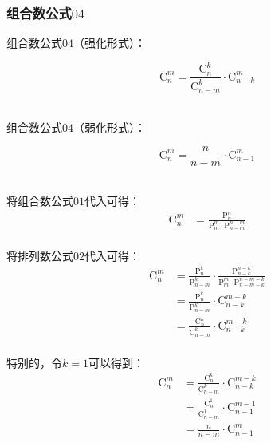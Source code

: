 \documentclass[UTF8]{ctexart}
\begin{document}
\subsubsection{组合数公式$04$}
    组合数公式$04$（强化形式）：
    \begin{large}
        \begin{equation*}
            \mathrm{C}_n^m=\frac{\mathrm{C}_n^k}{\mathrm{C}_{n-m}^k}\cdot\mathrm{C}_{n-k}^m
        \end{equation*}
    \end{large}\\
    组合数公式$04$（弱化形式）：
    \begin{large}
        \begin{equation*}
            \mathrm{C}_n^m=\frac{n}{n-m}\cdot\mathrm{C}_{n-1}^m
        \end{equation*}
    \end{large}\\
    将组合数公式$01$代入可得：
    \setcounter{equation}{0}
    \begin{align}
        \mathrm{C}_n^m
        &=\frac{\mathrm{P}_n^n}{\mathrm{P}_m^m\cdot\mathrm{P}_{n-m}^{n-m}}
    \end{align}\\
    将排列数公式$02$代入可得：
    \begin{align}
        \mathrm{C}_n^m
        &=\frac{\mathrm{P}_n^k}{\mathrm{P}_{n-m}^k}\cdot\frac{\mathrm{P}_{n-k}^{n-k}}{\mathrm{P}_{m}^{m}\cdot\mathrm{P}_{n-m-k}^{n-m-k}}\\[3mm]
        &=\frac{\mathrm{P}_n^k}{\mathrm{P}_{n-m}^k}\cdot\mathrm{C}_{n-k}^{m-k}\\[3mm]
        &=\frac{\mathrm{C}_n^k}{\mathrm{C}_{n-m}^k}\cdot\mathrm{C}_{n-k}^{m-k}
    \end{align}\\
    特别的，令$k=1$可以得到：
    \begin{align}
        \mathrm{C}_n^m
        &=\frac{\mathrm{C}_n^k}{\mathrm{C}_{n-m}^k}\cdot\mathrm{C}_{n-k}^{m-k}\\[3mm]
        &=\frac{\mathrm{C}_n^1}{\mathrm{C}_{n-m}^1}\cdot\mathrm{C}_{n-1}^{m-1}\\[3mm]
        &=\frac{n}{n-m}\cdot\mathrm{C}_{n-1}^{m}
    \end{align}
    
\newpage
\end{document}
